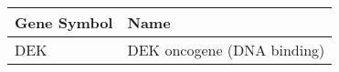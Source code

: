 \begin{tabular}{ll}
\toprule
Gene Symbol &                       Name \\
\midrule
        DEK & DEK oncogene (DNA binding) \\
\bottomrule
\end{tabular}

